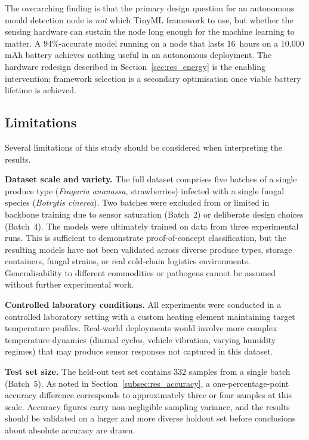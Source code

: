 The overarching finding is that the primary design question for an autonomous mould detection node is \textit{not} which TinyML framework to use, but whether the sensing hardware can sustain the node long enough for the machine learning to matter. A 94\%-accurate model running on a node that lasts 16~hours on a 10,000\,mAh battery achieves nothing useful in an autonomous deployment. The hardware redesign described in Section~\ref{sec:res_energy} is the enabling intervention; framework selection is a secondary optimisation once viable battery lifetime is achieved.

\subsection{Limitations}\label{subsec:res_limitations}

Several limitations of this study should be considered when interpreting the results.

\textbf{Dataset scale and variety.} The full dataset comprises five batches of a single produce type (\textit{Fragaria ananassa}, strawberries) infected with a single fungal species (\textit{Botrytis cinerea}). Two batches were excluded from or limited in backbone training due to sensor saturation (Batch~2) or deliberate design choices (Batch~4). The models were ultimately trained on data from three experimental runs. This is sufficient to demonstrate proof-of-concept classification, but the resulting models have not been validated across diverse produce types, storage containers, fungal strains, or real cold-chain logistics environments. Generalisability to different commodities or pathogens cannot be assumed without further experimental work.

\textbf{Controlled laboratory conditions.} All experiments were conducted in a controlled laboratory setting with a custom heating element maintaining target temperature profiles. Real-world deployments would involve more complex temperature dynamics (diurnal cycles, vehicle vibration, varying humidity regimes) that may produce sensor responses not captured in this dataset.

\textbf{Test set size.} The held-out test set contains 332 samples from a single batch (Batch~5). As noted in Section~\ref{subsec:res_accuracy}, a one-percentage-point accuracy difference corresponds to approximately three or four samples at this scale. Accuracy figures carry non-negligible sampling variance, and the results should be validated on a larger and more diverse holdout set before conclusions about absolute accuracy are drawn.

